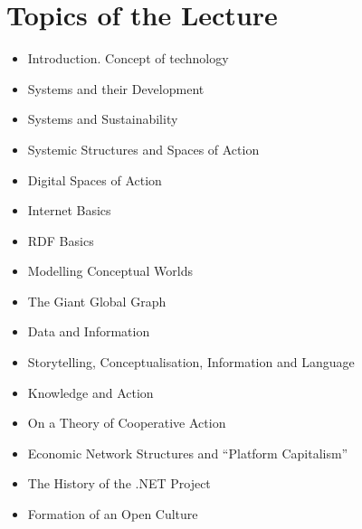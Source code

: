 \documentclass[11pt,a4paper]{article}
\newcommand{\enquote}[1]{``#1''}
\begin{document}
\section*{Topics of the Lecture}

\begin{itemize}
\item Introduction. Concept of technology
\item Systems and their Development
\item Systems and Sustainability
\item Systemic Structures and Spaces of Action
\item Digital Spaces of Action
\item Internet Basics
\item RDF Basics
\item Modelling Conceptual Worlds
\item The Giant Global Graph
\item Data and Information
\item Storytelling, Conceptualisation, Information and Language
\item Knowledge and Action
\item On a Theory of Cooperative Action
\item Economic Network Structures and \enquote{Platform Capitalism}
\item The History of the .NET Project
\item Formation of an Open Culture
\end{itemize}
\end{document}
